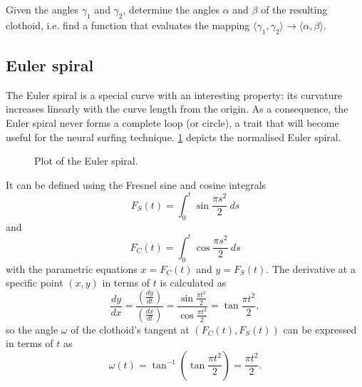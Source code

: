 \begin{problem}
    \label{prob:clothoid_construction}
    Given the angles $\gamma_1$ and $\gamma_2$, determine the angles $\alpha$ and $\beta$ of the resulting clothoid, i.e. find a function that evaluates the mapping $\langle\gamma_1,\gamma_2\rangle\rightarrow\langle\alpha,\beta\rangle$.
\end{problem}

\subsection{Euler spiral}
The Euler spiral is a special curve with an interesting property: its curvature increases linearly with the curve length from the origin.
As a consequence, the Euler spiral never forms a complete loop (or circle), a trait that will become useful for the neural surfing technique. 
\ref{fig:euler_spiral} depicts the normalised Euler spiral.
\begin{figure}
    \centering
    \caption{Plot of the Euler spiral.}
    \label{fig:euler_spiral}
\end{figure}
It can be defined using the Fresnel sine and cosine integrals
\begin{equation}
    \label{eq:fresnel_sine}
    F_S(t) = \int_0^t{\sin\frac{\pi s^2}{2} \ ds}
\end{equation}
and
\begin{equation}
    \label{eq:fresnel_cosine}
    F_C(t) = \int_0^t{\cos\frac{\pi s^2}{2} \ ds}
\end{equation}
with the parametric equations $x=F_C(t)$ and $y=F_S(t)$.
The derivative at a specific point $(x, y)$ in terms of $t$ is calculated as
\begin{equation*}
    \frac{dy}{dx}
    = \frac{\displaystyle\left(\frac{dy}{dt}\right)}{\displaystyle\left(\frac{dx}{dt}\right)}
    = \frac{\displaystyle\sin\frac{\pi t^2}{2}}{\displaystyle\cos\frac{\pi t^2}{2}}
    = \tan \frac{\pi t^2}{2},
\end{equation*}
so the angle $\omega$ of the clothoid's tangent at $\left(F_C(t),F_S(t)\right)$ can be expressed in terms of $t$ as
\begin{equation}
    \label{eq:clothoid_tangent_angle}
    \omega(t) = \tan^{-1} \left( \tan \frac{\pi t^2}{2} \right)
    = \frac{\pi t^2}{2}.
\end{equation}

